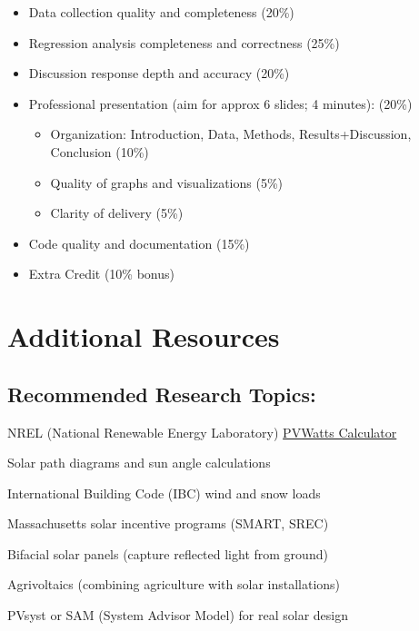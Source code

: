 \documentclass[11pt,twoside]{article}
\numberwithin{equation}{section}
\newcommand{\?}{\stackrel{?}{=}}
\begin{document}
\begin{warningbox}
\begin{itemize}[leftmargin=*]
    \item Data collection quality and completeness (20\%)
    \item Regression analysis completeness and correctness (25\%)
    \item Discussion response depth and accuracy (20\%)
    \item Professional presentation (aim for approx 6 slides; 4 minutes): (20\%)
    \begin{itemize}
        \item Organization: Introduction, Data, Methods, Results+Discussion, Conclusion (10\%)
        \item Quality of graphs and visualizations (5\%)
        \item Clarity of delivery (5\%)
    \end{itemize}
    \item Code quality and documentation (15\%)
    \item Extra Credit (10\% bonus)
\end{itemize}
\end{warningbox}

\section{Additional Resources}

\subsection*{Recommended Research Topics:}
\begin{compactitem} 
    \item NREL (National Renewable Energy Laboratory) \href{https://pvwatts.nrel.gov/}{PVWatts Calculator}
    \item Solar path diagrams and sun angle calculations
    \item International Building Code (IBC) wind and snow loads
    \item Massachusetts solar incentive programs (SMART, SREC)
    \item Bifacial solar panels (capture reflected light from ground)
    \item Agrivoltaics (combining agriculture with solar installations)
        \item PVsyst or SAM (System Advisor Model) for real solar design
\end{compactitem}
\end{document}
